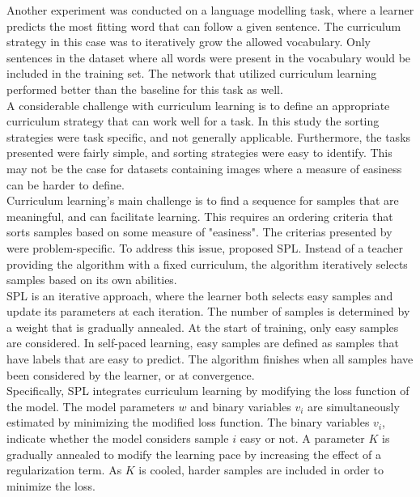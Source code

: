 Another experiment was conducted on a language modelling task, where a learner predicts the most fitting word that can follow a given sentence. The curriculum strategy in this case was to iteratively grow the allowed vocabulary. Only sentences in the dataset where all words were present in the vocabulary would be included in the training set. The network that utilized curriculum learning performed better than the baseline for this task as well.\\

A considerable challenge with curriculum learning is to define an appropriate curriculum strategy that can work well for a task. In this study the sorting strategies were task specific, and not generally applicable. Furthermore, the tasks presented were fairly simple, and sorting strategies were easy to identify. This may not be the case for datasets containing images where a measure of easiness can be harder to define.\\


Curriculum learning's main challenge is to find a sequence for samples that are meaningful, and can facilitate learning. This requires an ordering criteria that sorts samples based on some measure of "easiness". The criterias presented by \cite{Bengio_curriculumlearning} were problem-specific. To address this issue, \cite{Kumar_self_paced_learning} proposed \ac{SPL}. Instead of a teacher providing the algorithm with a fixed curriculum, the algorithm iteratively selects samples based on its own abilities. \\

\ac{SPL} is an iterative approach, where the learner both selects easy samples and update its parameters at each iteration. The number of samples is determined by a weight that is gradually annealed. At the start of training, only easy samples are considered. In self-paced learning, easy samples are defined as samples that have labels that are easy to predict.
The algorithm finishes when all samples have been considered by the learner, or at convergence.\\

Specifically, \ac{SPL} integrates curriculum learning by modifying the loss function of the model. The model parameters $w$ and binary variables $v_{i}$ are simultaneously estimated by minimizing the modified loss function. The binary variables $v_{i}$, indicate whether the model considers sample $i$ easy or not.  A parameter $K$ is gradually annealed to modify the learning pace by increasing the effect of a regularization term. As $K$ is cooled, harder samples are included in order to minimize the loss. \\

